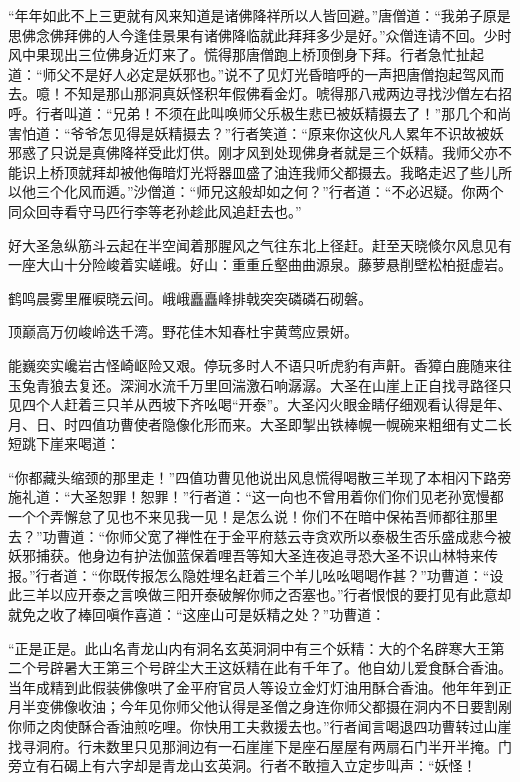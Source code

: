 \documentclass[12pt,UTF8]{ctexbook}
\begin{document}
{	“年年如此不上三更就有风来知道是诸佛降祥所以人皆回避。”唐僧道：“我弟子原是思佛念佛拜佛的人今逢佳景果有诸佛降临就此拜拜多少是好。”众僧连请不回。少时风中果现出三位佛身近灯来了。慌得那唐僧跑上桥顶倒身下拜。行者急忙扯起道：“师父不是好人必定是妖邪也。”说不了见灯光昏暗呼的一声把唐僧抱起驾风而去。噫！不知是那山那洞真妖怪积年假佛看金灯。唬得那八戒两边寻找沙僧左右招呼。行者叫道：“兄弟！不须在此叫唤师父乐极生悲已被妖精摄去了！”那几个和尚害怕道：“爷爷怎见得是妖精摄去？”行者笑道：“原来你这伙凡人累年不识故被妖邪惑了只说是真佛降祥受此灯供。刚才风到处现佛身者就是三个妖精。我师父亦不能识上桥顶就拜却被他侮暗灯光将器皿盛了油连我师父都摄去。我略走迟了些儿所以他三个化风而遁。”沙僧道：“师兄这般却如之何？”行者道：“不必迟疑。你两个同众回寺看守马匹行李等老孙趁此风追赶去也。”
	
	好大圣急纵筋斗云起在半空闻着那腥风之气往东北上径赶。赶至天晓倐尔风息见有一座大山十分险峻着实嵯峨。好山：重重丘壑曲曲源泉。藤萝悬削壁松柏挺虚岩。
	
	鹤鸣晨雾里雁唳晓云间。峨峨矗矗峰排戟突突磷磷石砌磐。
	
	顶巅高万仞峻岭迭千湾。野花佳木知春杜宇黄莺应景妍。
	
	能巍奕实巉岩古怪崎岖险又艰。停玩多时人不语只听虎豹有声鼾。香獐白鹿随来往玉兔青狼去复还。深涧水流千万里回湍激石响潺潺。大圣在山崖上正自找寻路径只见四个人赶着三只羊从西坡下齐吆喝“开泰”。大圣闪火眼金睛仔细观看认得是年、月、日、时四值功曹使者隐像化形而来。大圣即掣出铁棒幌一幌碗来粗细有丈二长短跳下崖来喝道：
	
	“你都藏头缩颈的那里走！”四值功曹见他说出风息慌得喝散三羊现了本相闪下路旁施礼道：“大圣恕罪！恕罪！”行者道：“这一向也不曾用着你们你们见老孙宽慢都一个个弄懈怠了见也不来见我一见！是怎么说！你们不在暗中保祐吾师都往那里去？”功曹道：“你师父宽了禅性在于金平府慈云寺贪欢所以泰极生否乐盛成悲今被妖邪捕获。他身边有护法伽蓝保着哩吾等知大圣连夜追寻恐大圣不识山林特来传报。”行者道：“你既传报怎么隐姓埋名赶着三个羊儿吆吆喝喝作甚？”功曹道：“设此三羊以应开泰之言唤做三阳开泰破解你师之否塞也。”行者恨恨的要打见有此意却就免之收了棒回嗔作喜道：“这座山可是妖精之处？”功曹道：
	
	“正是正是。此山名青龙山内有洞名玄英洞洞中有三个妖精：大的个名辟寒大王第二个号辟暑大王第三个号辟尘大王这妖精在此有千年了。他自幼儿爱食酥合香油。当年成精到此假装佛像哄了金平府官员人等设立金灯灯油用酥合香油。他年年到正月半变佛像收油；今年见你师父他认得是圣僧之身连你师父都摄在洞内不日要割剐你师之肉使酥合香油煎吃哩。你快用工夫救援去也。”行者闻言喝退四功曹转过山崖找寻洞府。行未数里只见那涧边有一石崖崖下是座石屋屋有两扇石门半开半掩。门旁立有石碣上有六字却是青龙山玄英洞。行者不敢擅入立定步叫声：“妖怪！
	
}
\end{document}
